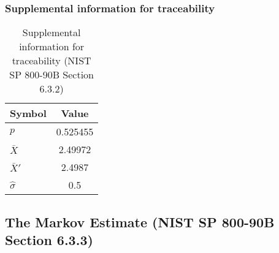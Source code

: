 \documentclass[a3paper,xelatex,english]{bxjsarticle}
\begin{document}
\subsubsection{Supplemental information for traceability}
\renewcommand{\arraystretch}{1.8}
\begin{table}[h]
\caption{Supplemental information for traceability (NIST SP 800-90B Section 6.3.2)}
\begin{center}
\begin{tabular}{|l|c|}
\hline 
\rowcolor{anotherlightblue} %
Symbol				& Value \\ \hline 
$p$				& 0.525455\\ \hline 
$\bar{X}$ 		&  2.49972\\ \hline
$\bar{X}'$		&   2.4987\\ \hline
$\hat{\sigma}$		&      0.5\\ \hline
\end{tabular}
\end{center}
\end{table}
\renewcommand{\arraystretch}{1.4}
\clearpage
\subsection{The Markov Estimate (NIST SP 800-90B Section 6.3.3)}\label{sec:Binary633}
\end{document}
